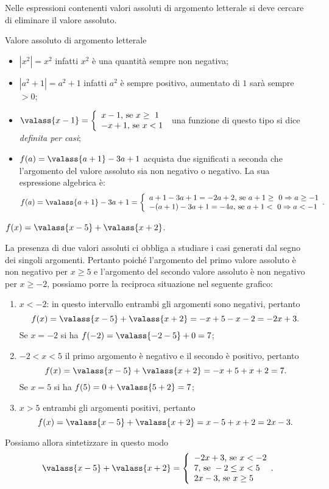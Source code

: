 Nelle espressioni contenenti valori assoluti di argomento letterale si deve cercare di eliminare il
valore assoluto.

\begin{exrig}
 \begin{esempio}
 Valore assoluto di argomento letterale
 \begin{itemize}
 \item $\left|{x^{2}}\right|=x^{2}$ infatti $x^{2}$ è una quantità sempre non negativa;
 \item $\left|{a^{2}+1}\right|=a^{2}+1$ infatti $a^{2}$ è sempre positivo, aumentato di $1$ sarà sempre $>0$;
 \item $\valass{x-1}=\left\{\begin{array}{l}
x-1\text{, se }x\ge~1\\
-x+1\text{, se }x<1\end{array}\right.$ una funzione di questo tipo si dice \emph{definita per casi};
 \item $f(a)=\valass{a+1}-3a+1$ acquista due significati a seconda che l'argomento del valore assoluto sia non negativo o negativo. La sua espressione algebrica è:
\[
f(a)=\valass{a+1}-3a+1=\left\{\begin{array}{l}
a+1-3a+1=-2a+2 \text{, se }a+1\ge~0\Rightarrow a\ge-1\\
-(a+1)-3a+1=-4a \text{, se }a+1<~0\Rightarrow a<-1\end{array}.\right.
\]
 \end{itemize}
 \end{esempio}
\begin{esempio}
 $f(x)=\valass{x-5}+\valass{x+2}$.

 La presenza di due valori assoluti ci obbliga a studiare i casi generati dal segno dei singoli argomenti.
 Pertanto poiché l'argomento del primo valore assoluto è non negativo per $x\ge 5$ e l'argomento del secondo valore assoluto è non negativo
 per $x\ge -2$, possiamo porre la reciproca situazione nel seguente grafico:
\begin{center}

\end{center}

\begin{enumerate}[label={(\Alph*)}]
 \item $x<-2$: in questo intervallo entrambi gli argomenti sono negativi, pertanto 
\[f(x)=\valass{x-5}+\valass{x+2}=-x+5-x-2=-2x+3.\]
Se $x=-2$ si ha $f(-2)=\valass{-2-5}+0=7$;
 \item $-2<x<5$ il primo argomento è negativo e il secondo è positivo, pertanto 
\[f(x)=\valass{x-5}+\valass{x+2}=-x+5+x+2=7.\]
Se $x=5$ si ha $f(5)=0+\valass{5+2}=7$;
 \item $x>5$ entrambi gli argomenti positivi, pertanto 
\[f(x)=\valass{x-5}+\valass{x+2}=x-5+x+2=2x-3.\]
\end{enumerate}
Possiamo allora sintetizzare in questo modo
\[
\valass{x-5}+\valass{x+2}=\left\{\begin{array}{l}
-2x+3 \text{, se }x<-2\\
7 \text{, se }-2\le x<5\\
2x-3 \text{, se }x\ge 5\end{array}.\right.
\]
\end{esempio}
\end{exrig}
\ovalbox{\risolvii \ref{ese:1.7}, \ref{ese:1.8}, \ref{ese:1.9}, \ref{ese:1.10}, \ref{ese:1.11}}

\newpage



\cleardoublepage

